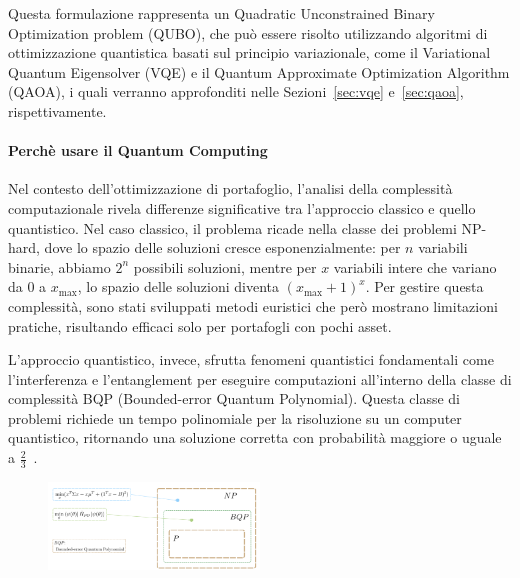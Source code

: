 Questa formulazione rappresenta un Quadratic Unconstrained Binary Optimization 
problem (QUBO), che può essere risolto utilizzando algoritmi di ottimizzazione 
quantistica basati sul principio variazionale, come il Variational Quantum Eigensolver 
(VQE) e il Quantum Approximate Optimization Algorithm (QAOA), i quali verranno
approfonditi nelle Sezioni~\ref{sec:vqe} e~\ref{sec:qaoa}, rispettivamente.


\paragraph{Perchè usare il Quantum Computing}
Nel contesto dell'ottimizzazione di portafoglio, l'analisi della complessità 
computazionale rivela differenze significative tra l'approccio classico e quello 
quantistico. Nel caso classico, il problema ricade nella classe dei problemi NP-hard, 
dove lo spazio delle soluzioni cresce esponenzialmente: per $n$ variabili binarie, 
abbiamo $2^n$ possibili soluzioni, mentre per $x$ variabili intere che variano da 
0 a $x_{\max}$, lo spazio delle soluzioni diventa $(x_{\max}+1)^x$. 
Per gestire questa complessità, sono stati sviluppati metodi euristici che però mostrano 
limitazioni pratiche, risultando efficaci solo per portafogli con pochi asset.

L'approccio quantistico, invece, sfrutta fenomeni quantistici fondamentali 
come l'interferenza e l'entanglement per eseguire computazioni all'interno della 
classe di complessità BQP (Bounded-error Quantum Polynomial). 
Questa classe di problemi richiede un tempo polinomiale per la risoluzione su un 
computer quantistico, ritornando una soluzione corretta con probabilità maggiore 
o uguale a $\frac{2}{3}$~\cite{buonaiuto2023best}.


\begin{figure}[h!]\label{fig:complessita}
    \centering
    \includegraphics[width=0.5\textwidth]{images/complessita.png}
    \caption{}
\end{figure}